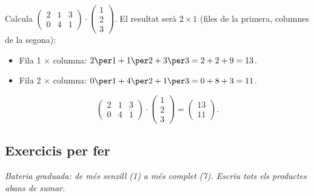 \begin{exresolt}
Calcula $\begin{pmatrix} 2 & 1 & 3 \\ 0 & 4 & 1 \end{pmatrix}\cdot\begin{pmatrix} 1 \\ 2 \\ 3 \end{pmatrix}$.
\solucio
El resultat serà $2\times 1$ (files de la primera, columnes de la segona):
\begin{itemize}[leftmargin=1.4em, itemsep=2pt]
  \item Fila 1 $\times$ columna: $2\per 1+1\per 2+3\per 3=2+2+9=13$.
  \item Fila 2 $\times$ columna: $0\per 1+4\per 2+1\per 3=0+8+3=11$.
\end{itemize}
\[
\begin{pmatrix} 2 & 1 & 3 \\ 0 & 4 & 1 \end{pmatrix}\cdot\begin{pmatrix} 1 \\ 2 \\ 3 \end{pmatrix}=\begin{pmatrix} 13 \\ 11 \end{pmatrix}.
\]
\end{exresolt}

\subsection{Exercicis per fer}

\textit{Bateria graduada: de més senzill (1) a més complet (7). Escriu tots els productes abans de sumar.}

